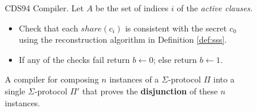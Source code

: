 \begin{figure}
\begin{protocol}[]{CDS94 Compiler. Let $A$ be the set of indices $i$ of the \textit{active clauses}.}
\begin{itemize}
\begin{itemize}
               \item Check that each $share(c_i)$ is consistent with the secret $c_0$ using the reconstruction algorithm in Definition \ref{def:sss}.
               \item If any of the checks fail return $b \leftarrow 0$; else return $b \leftarrow 1$.
           \end{itemize}
       \end{itemize}
    \end{protocol}
    \caption{A compiler for composing $n$ instances of a $\Sigma$-protocol $\Pi$ into a single $\Sigma$-protocol $\Pi'$ that proves the \textbf{disjunction} of these $n$ instances.}
    \label{fig:cds94-compiler}
\end{figure}

